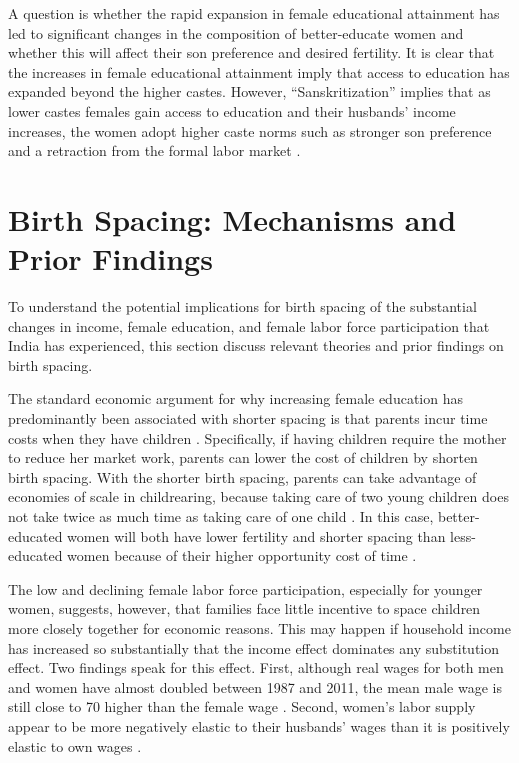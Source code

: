 \documentclass[12pt,letterpaper]{article}
\begin{document}
A question is whether the rapid expansion in female educational attainment has led
to significant changes in the composition of better-educate women and whether this will
affect their son preference and desired fertility.
It is clear that the increases in female educational attainment imply that access to 
education has expanded beyond the higher castes. 
However, ``Sanskritization'' implies that as lower castes females gain access to 
education and their husbands' income increases, the women adopt higher caste 
norms such as stronger son preference and a retraction from the formal labor 
market \citep{Srinivas1956,Chen1995,Abraham2013,Chatterjee2018}. 


\section{Birth Spacing: Mechanisms and Prior Findings}

To understand the potential implications for birth spacing of the substantial changes in 
income, female education, and female labor force participation that India has experienced, 
this section discuss relevant theories and prior findings on birth spacing.

The standard economic argument for why increasing female education has predominantly
been associated with shorter spacing is that parents incur time costs when they have 
children \citep{Hotz1997,schultz97}.
Specifically, if having children require the mother to reduce her market work, parents 
can lower the cost of children by shorten birth spacing.
With the shorter birth spacing, parents can take advantage of economies of scale in 
childrearing, because taking care of two young children does not take twice as much 
time as taking care of one child \citep{Vijverberg1982}.
In this case, better-educated women will both have lower fertility and shorter
spacing than less-educated women because of their higher opportunity cost of time 
\citep{Ross1974,Newman1984}.

The low and declining female labor force participation, especially for younger women, 
suggests, however, that families face little incentive to space children more closely 
together for economic reasons.
This may happen if household income has increased so substantially that the income effect 
dominates any substitution effect.
Two findings speak for this effect.
First, although real wages for both men and women have almost doubled between 1987 and 
2011, the mean male wage is still close to 70 higher than the female wage 
\citep{Klasen2015,Bhargava2018}.
Second, women’s labor supply appear to be more negatively elastic to their husbands' 
wages than it is positively elastic to own wages \citep{Bhargava2018}.
\end{document}
